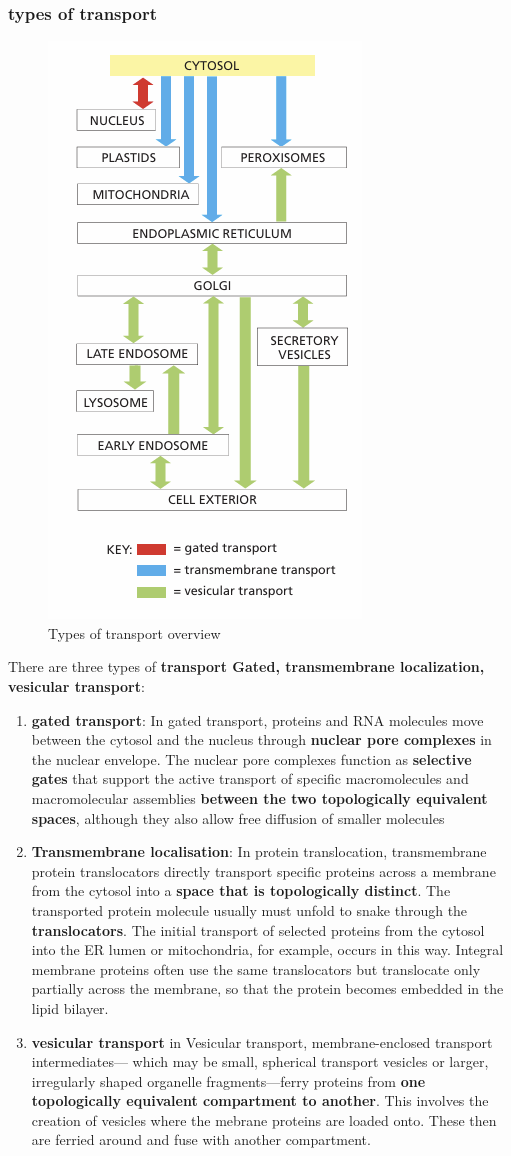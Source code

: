 \documentclass[../main.tex]{subfiles}
\begin{document}
\subsubsection{types of transport}


\begin{figure}[H]
    \centering
    \includegraphics[width=0.3\linewidth]{typesOfTransport.png}
    \caption{Types of transport overview}
    \label{fig:enter-label}
\end{figure}
There are three types of \textbf{transport Gated, transmembrane localization, vesicular transport}:

\begin{enumerate}
    \item \textbf{gated transport}: In gated transport, proteins and RNA molecules move between the 
cytosol and the nucleus through \textbf{nuclear pore complexes} in the nuclear envelope. The 
nuclear pore complexes function as \textbf{selective gates} that support the active transport of 
specific macromolecules and macromolecular assemblies \textbf{between the two topologically 
equivalent spaces}, although they also allow free diffusion of smaller molecules

\item \textbf{Transmembrane localisation}: In protein translocation, transmembrane protein 
translocators directly transport specific proteins across a membrane from the cytosol 
into a \textbf{space that is topologically distinct}. The transported protein molecule usually must 
unfold to snake through the \textbf{\gls{translocators}}. The initial transport of selected proteins from 
the cytosol into the ER lumen or mitochondria, for example, occurs in this way. Integral 
membrane proteins often use the same translocators but translocate only partially 
across the membrane, so that the protein becomes embedded in the lipid bilayer.

\item \textbf{vesicular transport} in Vesicular transport, membrane-enclosed transport 
intermediates— which may be small, spherical transport vesicles or larger, irregularly 
shaped organelle fragments—ferry proteins from\textbf{ one topologically equivalent 
compartment to another}. This involves the creation of vesicles where the mebrane proteins are loaded onto. These then are ferried around and fuse with another compartment.

\end{enumerate}
\end{document}
